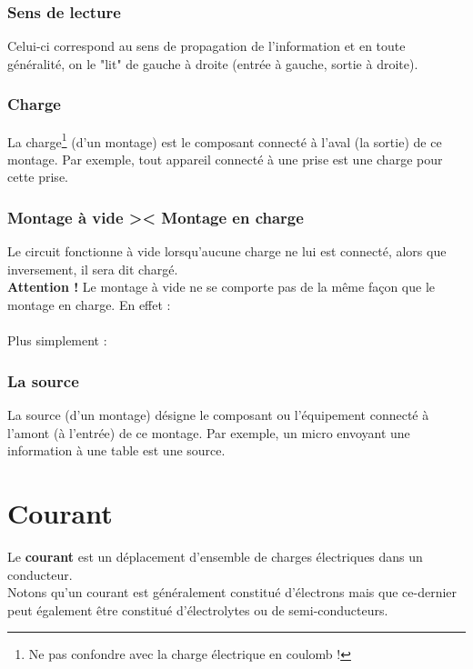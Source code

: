 \documentclass[11pt, a4paper, openany]{book}
\begin{document}
		\subsubsection{Sens de lecture}
		Celui-ci correspond au sens de propagation de l'information et en toute généralité, on le "lit" de gauche à droite (entrée à gauche, sortie à droite).
		
		\subsubsection{Charge}
		La charge\footnote{Ne pas confondre avec la charge électrique en coulomb !} (d'un montage) est le composant connecté à l'aval (la sortie) de ce montage. Par exemple, tout appareil connecté à une prise est une charge pour cette prise.
		
		\subsubsection{Montage à vide >< Montage en charge}
		Le circuit fonctionne à vide lorsqu'aucune charge ne lui est connecté, alors que inversement, il sera dit chargé.\\
		\textbf{Attention !} Le montage à vide ne se comporte pas de la même façon que le montage en charge. En effet :\\
		\ \\
		
		Plus simplement : \\
		
		\subsubsection{La source}
		La source (d'un montage) désigne le composant ou l'équipement connecté à l'amont (à l'entrée) de ce montage. Par exemple, un micro envoyant une information à une table est une source.
		
		
		\section{Courant}
		Le \textbf{courant} est un déplacement d'ensemble de charges électriques dans un conducteur.\\
		Notons qu'un courant est généralement constitué d'électrons mais que ce-dernier peut également être constitué d'électrolytes ou de semi-conducteurs.
		
\end{document}
